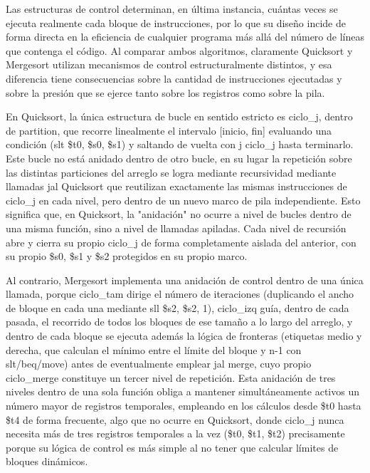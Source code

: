 \documentclass[12pt, letterpaper]{article}
\begin{document}
Las estructuras de control determinan, en última instancia, cuántas veces se ejecuta realmente cada bloque de instrucciones, por lo que su diseño incide de forma directa en la eficiencia de cualquier programa más allá del número de líneas que contenga el código. Al comparar ambos algoritmos, claramente Quicksort y Mergesort utilizan mecanismos de control estructuralmente distintos, y esa diferencia tiene consecuencias sobre la cantidad de instrucciones ejecutadas y sobre la presión que se ejerce tanto sobre los registros como sobre la pila.

En Quicksort, la única estructura de bucle en sentido estricto es ciclo\_j, dentro de partition, que recorre linealmente el intervalo [inicio, fin] evaluando una condición (slt \$t0, \$s0, \$s1) y saltando de vuelta con j ciclo\_j hasta terminarlo. Este bucle no está anidado dentro de otro bucle, en su lugar la repetición sobre las distintas particiones del arreglo se logra mediante recursividad mediante llamadas jal Quicksort que reutilizan exactamente las mismas instrucciones de ciclo\_j en cada nivel, pero dentro de un nuevo marco de pila independiente. Esto significa que, en Quicksort, la "anidación" no ocurre a nivel de bucles dentro de una misma función, sino a nivel de llamadas apiladas. Cada nivel de recursión abre y cierra su propio ciclo\_j de forma completamente aislada del anterior, con su propio \$s0, \$s1 y \$s2 protegidos en su propio marco.

Al contrario, Mergesort implementa una anidación de control dentro de una única llamada, porque ciclo\_tam dirige el número de iteraciones (duplicando el ancho de bloque en cada una mediante sll \$s2, \$s2, 1), ciclo\_izq guía, dentro de cada pasada, el recorrido de todos los bloques de ese tamaño a lo largo del arreglo, y dentro de cada bloque se ejecuta además la lógica de fronteras (etiquetas medio y derecha, que calculan el mínimo entre el límite del bloque y n-1 con slt/beq/move) antes de eventualmente emplear jal merge, cuyo propio ciclo\_merge constituye un tercer nivel de repetición. Esta anidación de tres niveles dentro de una sola función obliga a mantener simultáneamente activos un número mayor de registros temporales, empleando en los cálculos desde \$t0 hasta \$t4 de forma frecuente, algo que no ocurre en Quicksort, donde ciclo\_j nunca necesita más de tres registros temporales a la vez (\$t0, \$t1, \$t2) precisamente porque su lógica de control es más simple al no tener que calcular límites de bloques dinámicos.
\end{document}
